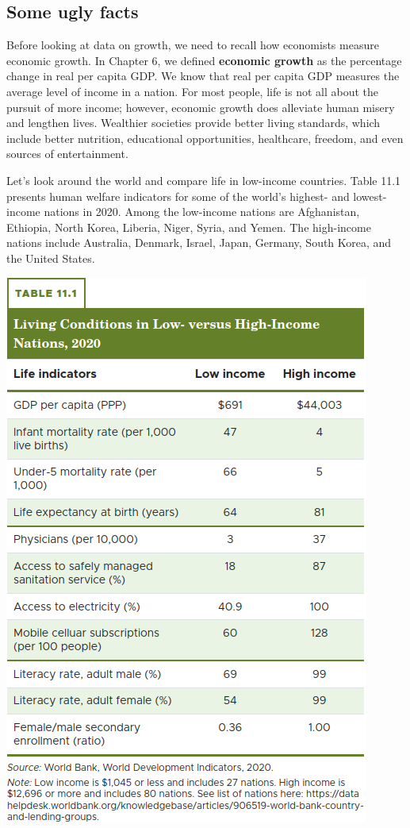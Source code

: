 \documentclass[11pt]{article} %
\theoremstyle{plain}
\theoremstyle{definition}
\begin{document}
\subsection*{Some ugly facts}
Before looking at data on growth, we need to recall how economists measure economic growth. In Chapter 6, we defined \textbf{economic growth} as the percentage change in real per capita GDP. We know that real per capita GDP measures the average level of income in a nation. For most people, life is not all about the pursuit of more income; however, economic growth does alleviate human misery and lengthen lives. Wealthier societies provide better living standards, which include better nutrition, educational opportunities, healthcare, freedom, and even sources of entertainment.

Let's look around the world and compare life in low-income countries. Table 11.1 presents human welfare indicators for some of the world's highest- and lowest-income nations in 2020. Among the low-income nations are Afghanistan, Ethiopia, North Korea, Liberia, Niger, Syria, and Yemen. The high-income nations include Australia, Denmark, Israel, Japan, Germany, South Korea, and the United States.

\begin{center}
\includegraphics[scale=0.5]{../../images/Chapter 11/table 11.1.png}
\end{center}
\end{document}
